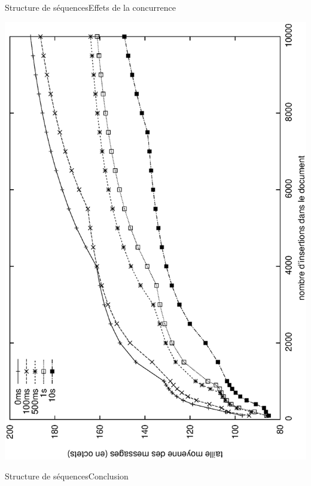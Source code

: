 \begin{frame}{Structure de séquences}{Effets de la concurrence}
  \vspace{-0.5cm}
  \begin{center}
    \includegraphics[angle=-90, width=\textwidth]{img/replication/latency.eps}
  \end{center}
\end{frame}

\begin{frame}{Structure de séquences}{Conclusion}


\end{frame}
